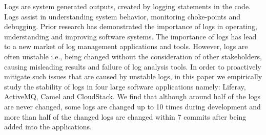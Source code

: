 
Logs are system generated outputs, created by logging statements in the code. Logs assist in understanding system behavior, monitoring choke-points and debugging. Prior research has demonstrated the importance of logs in operating, understanding and improving software systems. The importance of logs has lead to a new market of log management applications and tools. However, logs are often unstable i.e., being changed without the consideration of other stakeholders, causing misleading results and failure of log analysis tools. In order to proactively mitigate such issues that are caused by unstable logs, in this paper we empirically study the stability of logs in four large software applications namely: Liferay, ActiveMQ, Camel and CloudStack. We find that although around half of the logs are never changed, some logs are changed up to 10 times during development and more than half of the changed logs are changed within 7 commits after being added into the applications. 

